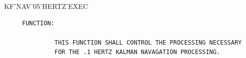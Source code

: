 \begin{frame}
KF'NAV'05'HERTZ'EXEC
\begin{verbatim}
     FUNCTION:

              THIS FUNCTION SHALL CONTROL THE PROCESSING NECESSARY
              FOR THE .1 HERTZ KALMAN NAVAGATION PROCESSING.

\end{verbatim}
\end{frame}
